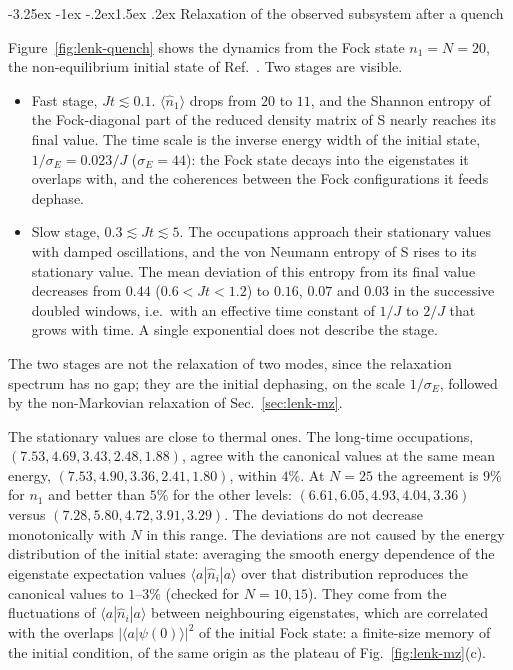 \documentclass[10pt,a4paper]{article}
\makeatletter
\renewcommand{\subsection}{\@startsection{subsection}{2}{\z@}%
  {-3.25ex \@plus -1ex \@minus -.2ex}{1.5ex \@plus .2ex}%
  {\normalfont\fontsize{15.5pt}{19pt}\selectfont\bfseries}}
\makeatother
\begin{document}
\subsection{Relaxation of the observed subsystem after a quench}
\label{sec:lenk-quench}

Figure~\ref{fig:lenk-quench} shows the dynamics from the Fock state $ n_1 = N = 20 $, the non-equilibrium initial state of Ref.~\cite{Lenk2025}.
Two stages are visible.
\begin{itemize}[leftmargin=1.5em]
\item Fast stage, $ Jt \lesssim 0.1 $. $ \langle\hat n_1\rangle $ drops from $ 20 $ to $ 11 $, and the Shannon entropy of the Fock-diagonal part of the reduced density matrix of S nearly reaches its final value. The time scale is the inverse energy width of the initial state, $ 1/\sigma_E = 0.023/J $ ($ \sigma_E = 44 $): the Fock state decays into the eigenstates it overlaps with, and the coherences between the Fock configurations it feeds dephase.
\item Slow stage, $ 0.3 \lesssim Jt \lesssim 5 $. The occupations approach their stationary values with damped oscillations, and the von Neumann entropy of S rises to its stationary value. The mean deviation of this entropy from its final value decreases from $ 0.44 $ ($ 0.6 < Jt < 1.2 $) to $ 0.16 $, $ 0.07 $ and $ 0.03 $ in the successive doubled windows, i.e.\ with an effective time constant of $ 1/J $ to $ 2/J $ that grows with time. A single exponential does not describe the stage.
\end{itemize}
The two stages are not the relaxation of two modes, since the relaxation spectrum has no gap; they are the initial dephasing, on the scale $ 1/\sigma_E $, followed by the non-Markovian relaxation of Sec.~\ref{sec:lenk-mz}.

The stationary values are close to thermal ones.
The long-time occupations, $ (7.53, 4.69, 3.43, 2.48, 1.88) $, agree with the canonical values at the same mean energy, $ (7.53, 4.90, 3.36, 2.41, 1.80) $, within $ 4\% $.
At $ N = 25 $ the agreement is $ 9\% $ for $ n_1 $ and better than $ 5\% $ for the other levels: $ (6.61, 6.05, 4.93, 4.04, 3.36) $ versus $ (7.28, 5.80, 4.72, 3.91, 3.29) $.
The deviations do not decrease monotonically with $ N $ in this range.
The deviations are not caused by the energy distribution of the initial state: averaging the smooth energy dependence of the eigenstate expectation values $ \langle a | \hat n_i | a \rangle $ over that distribution reproduces the canonical values to $ 1 $--$ 3\% $ (checked for $ N = 10, 15 $).
They come from the fluctuations of $ \langle a | \hat n_i | a \rangle $ between neighbouring eigenstates, which are correlated with the overlaps $ |\langle a | \psi(0) \rangle|^2 $ of the initial Fock state: a finite-size memory of the initial condition, of the same origin as the plateau of Fig.~\ref{fig:lenk-mz}(c).
\end{document}
